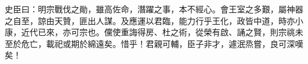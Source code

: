 \begin{pinyinscope}
 史臣曰：明宗戰伐之勛，雖高佐命，潛躍之事，本不經心。會王室之多艱，屬神器之自至，諒由天贊，匪出人謀。及應運以君臨，能力行乎王化，政皆中道，時亦小康，近代已來，亦可宗也。儻使重誨得房、杜之術，從榮有啟、誦之賢，則宗祧未至於危亡，載祀或期於綿遠矣。惜乎！君親可輔，臣子非才，遽泯烝嘗，良可深嘆矣！



\end{pinyinscope}